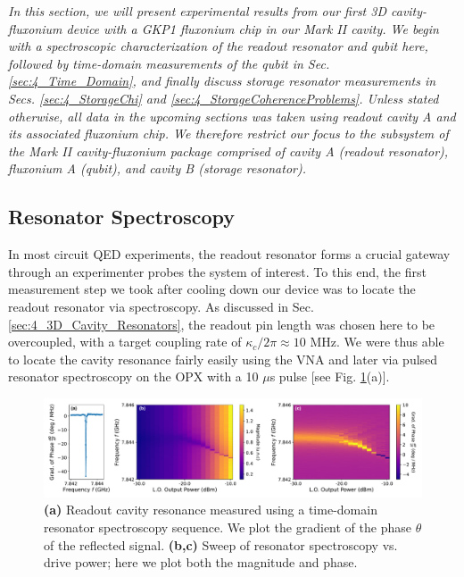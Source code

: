 \textit{In this section, we will present experimental results from our first 3D cavity-fluxonium device with a GKP1 fluxonium chip in our Mark II cavity. We begin with a spectroscopic characterization of the readout resonator and qubit here, followed by time-domain measurements of the qubit in Sec. \ref{sec:4_Time_Domain}, and finally discuss storage resonator measurements in Secs. \ref{sec:4_StorageChi} and \ref{sec:4_StorageCoherenceProblems}. Unless stated otherwise, all data in the upcoming sections was taken using readout cavity A and its associated fluxonium chip. We therefore restrict our focus to the subsystem of the Mark II cavity-fluxonium package comprised of cavity A (readout resonator), fluxonium A (qubit), and cavity B (storage resonator).}

\subsection{Resonator Spectroscopy}
In most circuit QED experiments, the readout resonator forms a crucial gateway through an experimenter probes the system of interest. To this end, the first measurement step we took after cooling down our device was to locate the readout resonator via spectroscopy. As discussed in Sec. \ref{sec:4_3D_Cavity_Resonators}, the readout pin length was chosen here to be overcoupled, with a target coupling rate of $\kappa_c/2\pi \approx 10$ MHz. We were thus able to locate the cavity resonance fairly easily using the VNA and later via pulsed resonator spectroscopy on the OPX with a 10 $\mu$s pulse [see Fig. \ref{fig:4_resonator_spectroscopy}(a)].
\begin{figure}[h!]
    \centering
    \includegraphics[width=\linewidth]{Figures/4/resonator_spectroscopy.pdf}
    \caption{\textbf{(a)} Readout cavity resonance measured using a time-domain resonator spectroscopy sequence. We plot the gradient of the phase $\theta$ of the reflected signal. \textbf{(b,c)} Sweep of resonator spectroscopy vs. drive power; here we plot both the magnitude and phase.}
    \label{fig:4_resonator_spectroscopy}
\end{figure}

